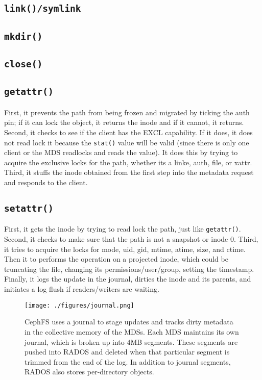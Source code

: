 \documentclass[conference]{acm_proc_article-sp} \usepackage[english]{babel}
\begin{document}
\subsection{\texttt{link()/symlink }} \subsection{\texttt{mkdir()}}

\subsection{\texttt{close()}}

\subsection{\texttt{getattr()}} First, it prevents the path from being frozen
and migrated by ticking the auth pin; if it can lock the object, it returns the
inode and if it cannot, it returns. Second, it checks to see if the client has
the EXCL capability. If it does, it does not read lock it because the
\texttt{stat()} value will be valid (since there is only one client or the MDS
readlocks and reads the value). It does this by trying to acquire the exclusive
locks for the path, whether its a linke, auth, file, or xattr. Third, it stuffs
the inode obtained from the first step into the metadata request and responds
to the client.

\subsection{\texttt{setattr()}} First, it gets the inode by trying to read lock
the path, just like \texttt{getattr()}. Second, it checks to make sure that the
path is not a snapshot or inode 0. Third, it tries to acquire the locks for
mode, uid, gid, mtime, atime, size, and ctime. Then it to performs the
operation on a projected inode, which could be truncating the file, changing
its permissions/user/group, setting the timestamp. Finally, it logs the update
in the journal, dirties the inode and its parents, and initiates a log flush if
readers/writers are waiting.

\begin{figure*}[tb] \centering
\texttt{[image: ./figures/journal.png]} \caption{CephFS uses
a journal to stage updates and tracks dirty metadata in the collective memory
of the MDSs. Each MDS maintains its own journal, which is broken up into 4MB
segments. These segments are pushed into RADOS and deleted when that particular
segment is trimmed from the end of the log. In addition to journal segments,
RADOS also stores per-directory objects. \label{figure:journal}} \end{figure*}
\end{document}
